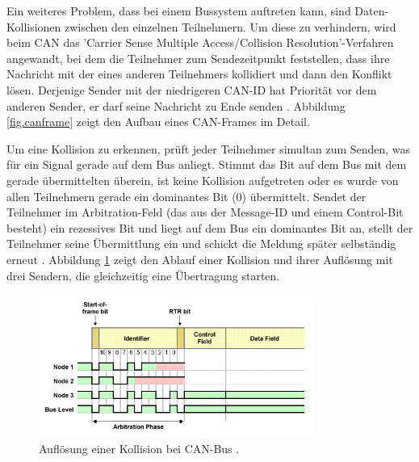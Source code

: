 Ein weiteres Problem, dass bei einem Bussystem auftreten kann, sind Daten-Kollisionen zwischen den einzelnen Teilnehmern. Um diese zu verhindern, wird beim CAN das 'Carrier Sense Multiple Access/Collision Resolution'-Verfahren angewandt, bei dem die Teilnehmer zum Sendezeitpunkt feststellen, dass ihre Nachricht mit der eines anderen Teilnehmers kollidiert und dann den Konflikt lösen. Derjenige Sender mit der niedrigeren CAN-ID hat Priorität vor dem anderen Sender, er darf seine Nachricht zu Ende senden \cite{boschcanspec2}. Abbildung \ref{fig.canframe} zeigt den Aufbau eines CAN-Frames im Detail.

Um eine Kollision zu erkennen, prüft jeder Teilnehmer simultan zum Senden, was für ein Signal gerade auf dem Bus anliegt. Stimmt das Bit auf dem Bus mit dem gerade übermittelten überein, ist keine Kollision aufgetreten oder es wurde von allen Teilnehmern gerade ein dominantes Bit (0) übermittelt. Sendet der Teilnehmer im Arbitration-Feld (das aus der Message-ID und einem Control-Bit besteht) ein rezessives Bit und liegt auf dem Bus ein dominantes Bit an, stellt der Teilnehmer seine Übermittlung ein und schickt die Meldung später selbständig erneut \cite{boschcanspec2}. Abbildung \ref{fig.canarbitration} zeigt den Ablauf einer Kollision und ihrer Auflösung mit drei Sendern, die gleichzeitig eine Übertragung starten. 

\begin{figure}
	\centering
		\includegraphics[width=0.8\textwidth]{images/canarbitration.png}
	\caption{Auflösung einer Kollision bei CAN-Bus \cite{canarbit}.}
	\label{fig.canarbitration}
\end{figure}


